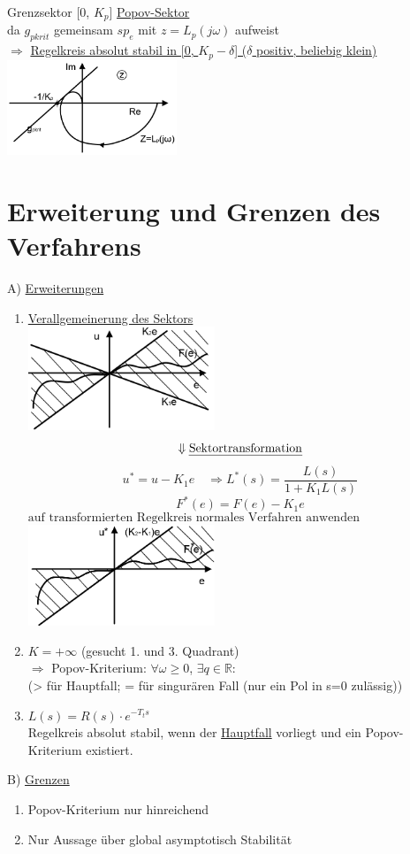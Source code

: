 \documentclass[openany,a4paper,11pt]{book}
\begin{document}
Grenzsektor [0, $K_p$] \uline{Popov-Sektor}\\
da $g_{pkrit}$ gemeinsam $sp_e$ mit $z=L_p(j\omega)$ aufweist\\
$\Rightarrow$ \uline{Regelkreis absolut stabil in [0, $K_p-\delta$] ($\delta$ positiv, beliebig klein)}\\
\includegraphics[width=2in]{imgs/NLR69.png}
\section[Erweiterung und Grenzen]{Erweiterung und Grenzen des Verfahrens}
A) \uline{Erweiterungen}\\
\begin{enumerate}
    \item \uline{Verallgemeinerung des Sektors}\\
    \includegraphics[width=2.2in]{imgs/NLR70.png}
    \[\Downarrow \text{\uline{Sektortransformation}}\]
    \[u^*=u-K_1e\quad \Rightarrow L^*(s)=\frac{L(s)}{1+K_1L(s)}\]
    \[F^*(e)=F(e)-K_1e\]
    \[\text{auf transformierten Regelkreis normales Verfahren anwenden (Voraussetzungen beachten!)}\]
    \includegraphics[width=2.2in]{imgs/NLR71.png}
    \item \uline{$K=+\infty$} (gesucht 1. und 3. Quadrant)\\
    $\Rightarrow$ Popov-Kriterium: $\forall \omega \ge 0$, $\exists q \in \mathbb{R}:$  \\
    (> für Hauptfall; = für singurären Fall (nur ein Pol in s=0 zulässig))
    \item \uline{$L(s)=R(s)\cdot e^{-T_ts}$}\\
    Regelkreis absolut stabil, wenn der \uline{Hauptfall} vorliegt und ein Popov-Kriterium  existiert.
\end{enumerate}
B) \uline{Grenzen}\\
\begin{enumerate}
    \item Popov-Kriterium nur hinreichend  
    \item Nur Aussage über global asymptotisch Stabilität
\end{enumerate}
\end{document}
